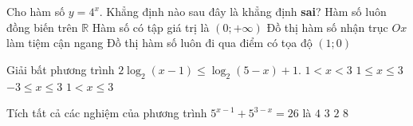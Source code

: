 \begin{ex}%
	Cho hàm số $y = 4^x$. Khẳng định nào sau đây là khẳng định \textbf{sai}?
	\choice
	{Hàm số luôn đồng biến trên $\mathbb{R}$}
	{Hàm số có tập giá trị là $(0; +\infty)$}
	{Đồ thị hàm số nhận trục $Ox$ làm tiệm cận ngang}
	{\True Đồ thị hàm số luôn đi qua điểm có tọa độ $(1; 0)$}
\end{ex}

\begin{ex}%
	Giải bất phương trình $2\log_2 (x - 1) \leq \log_2 (5 - x) + 1$.
	\choice
	{$1 < x < 3$}
	{$1 \leq x \leq 3$}
	{$-3 \leq x \leq 3$}
	{\True $1 < x \leq 3$}
\end{ex}

\begin{ex}%
	Tích tất cả các nghiệm của phương trình $5^{x - 1} + 5^{3 - x} = 26$ là
	\choice
	{$4$}
	{\True $3$}
	{$2$}
	{$8$}
\end{ex}

